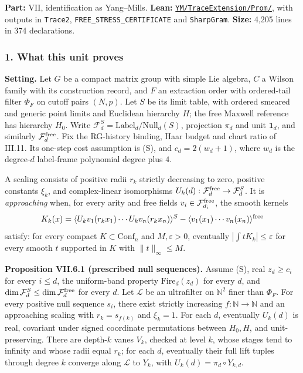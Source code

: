 \documentclass[
  letterpaper,
  11pt]{article}
\begin{document}
\textbf{Part:} VII, identification as Yang--Mills. \textbf{Lean:}
\href{https://github.com/yang-mills-group/OpenAI-YM-20261028/tree/3456e5e75cf8d4cd558955a5c7638fba2d68f464/YM/TraceExtension/Prom}{\texttt{YM/TraceExtension/Prom/}},
with outputs in \texttt{Trace2}, \texttt{FREE\_STRESS\_CERTIFICATE} and
\texttt{SharpGram}. \textbf{Size:} 4,205 lines in 374 declarations.

\subsubsection{1. What this unit proves}\label{what-this-unit-proves-30}

\textbf{Setting.} Let \(G\) be a compact matrix group with simple Lie
algebra, \(C\) a Wilson family with its construction record, and \(F\)
an extraction order with ordered-tail filter \(\Phi_F\) on cutoff pairs
\((N,p)\). Let \(S\) be its limit table, with ordered smeared and
generic point limits and Euclidean hierarchy \(H\); the free Maxwell
reference has hierarchy \(H_0\). Write
\(\mathcal F^S_d=\mathrm{Label}_d/\mathrm{Null}_d(S)\), projection
\(\pi_d\) and unit \(\mathbf1_d\), and similarly
\(\mathcal F^{\rm free}_d\). Fix the RG-history binding, Haar budget and
chart ratio of III.11. Its one-step cost assumption is (S), and
\(c_d=2(w_d+1)\), where \(w_d\) is the degree-\(d\) label-frame
polynomial degree plus \(4\).

A scaling consists of positive radii \(r_k\) strictly decreasing to
zero, positive constants \(\xi_k\), and complex-linear isomorphisms
\(U_k(d):\mathcal F^{\rm free}_d\to\mathcal F^S_d\). It is
\emph{approaching} when, for every arity and free fields
\(v_i\in\mathcal F^{\rm free}_{d_i}\), the smooth kernels
\[K_k(x)=\langle U_kv_1(r_kx_1)\cdots U_kv_n(r_kx_n)\rangle^S-\langle v_1(x_1)\cdots v_n(x_n)\rangle^{\rm free}\]
satisfy: for every compact \(K\subset\mathrm{Conf}_n\) and
\(M,\varepsilon>0\), eventually \(|\int tK_k|\le\varepsilon\) for every
smooth \(t\) supported in \(K\) with \(\|t\|_\infty\le M\).

\textbf{Proposition VII.6.1 (prescribed null sequences).} Assume (S),
real \(z_d\ge c_i\) for every \(i\le d\), the uniform-band property
\(\mathrm{Fire}_d(z_d)\) for every \(d\), and
\(\dim\mathcal F^S_d\le\dim\mathcal F^{\rm free}_d\) for every \(d\).
Let \(\mathcal L\) be an ultrafilter on \(\mathbb N^2\) finer than
\(\Phi_F\). For every positive null sequence \(s_i\), there exist
strictly increasing \(f:\mathbb N\to\mathbb N\) and an approaching
scaling with \(r_k=s_{f(k)}\) and \(\xi_k=1\). For each \(d\),
eventually \(U_k(d)\) is real, covariant under signed coordinate
permutations between \(H_0,H\), and unit-preserving. There are
depth-\(k\) vanes \(V_k\), checked at level \(k\), whose stages tend to
infinity and whose radii equal \(r_k\); for each \(d\), eventually their
full lift tuples through degree \(k\) converge along \(\mathcal L\) to
\(Y_k\), with \(U_k(d)=\pi_d\circ Y_{k,d}\).
\end{document}
